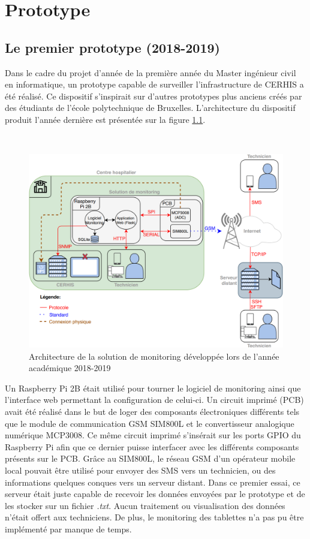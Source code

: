 \chapter{Prototype}

\section{Le premier prototype (2018-2019)}

\noindent
Dans le cadre du projet d’année de la première année du Master ingénieur civil en informatique, un prototype capable de surveiller l’infrastructure de CERHIS a été réalisé. Ce dispositif s’inspirait sur d’autres prototypes plus anciens créés par des étudiants de l’école polytechnique de Bruxelles. L’architecture du dispositif produit l’année dernière est présentée sur la figure \ref{fig:archi_prev}.

~

\begin{figure}[ht!]
  \includegraphics[width=\textwidth]{img/el_prototype/archi_prev.png}
  \caption{Architecture de la solution de monitoring développée lors de l'année académique 2018-2019}
  \label{fig:archi_prev}
\end{figure}



\noindent
Un Raspberry Pi 2B était utilisé pour tourner le logiciel de monitoring ainsi que l’interface web permettant la configuration de celui-ci. Un circuit imprimé (PCB) avait été réalisé dans le but de loger des composants électroniques différents tels que le module de communication GSM SIM800L et le convertisseur analogique numérique MCP3008. Ce même circuit imprimé s’insérait sur les ports GPIO du Raspberry Pi afin que ce dernier puisse interfacer avec les différents composants présents sur le PCB. Grâce au SIM800L, le réseau GSM d’un opérateur mobile local pouvait être utilisé pour envoyer des SMS vers un technicien, ou des informations quelques conques vers un serveur distant.  Dans ce premier essai, ce serveur était juste capable de recevoir les données envoyées par le prototype et de les stocker sur un fichier \textit{.txt}. Aucun traitement ou visualisation des données n’était offert aux techniciens. De plus, le monitoring des tablettes n'a pas pu être implémenté par manque de temps.

